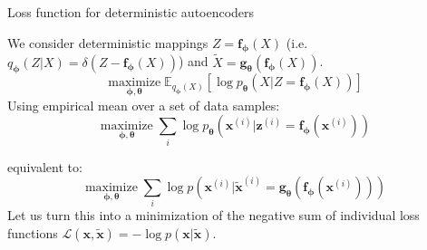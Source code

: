 \documentclass[handout]{beamer}
\begin{document}
  \begin{frame}{Loss function for deterministic autoencoders}

    We consider \alert{deterministic} mappings $Z = \mathbf{f}_{\boldsymbol{\phi}}(X)$ (i.e. $q_{\boldsymbol{\phi}}(Z|X) = \delta(Z - \mathbf{f}_{\boldsymbol{\phi}}(X))$) and $\tilde{X} = \mathbf{g}_{\boldsymbol{\theta}}(\mathbf{f}_{\boldsymbol{\phi}}(X))$.
    \vspace{0cm}
    \begin{equation*}
      \underset{\boldsymbol{\phi},\boldsymbol{\theta}}{\text{maximize}} \; \mathbb{E}_{q_{\boldsymbol{\phi}}(X)}\left[\log p_{\boldsymbol{\theta}}(X|Z = \mathbf{f}_{\boldsymbol{\phi}}(X))\right]
    \end{equation*}
    \pause
    Using empirical mean over a set of data samples:
    \vspace{0cm}
    \begin{equation*}
      \underset{\boldsymbol{\phi},\boldsymbol{\theta}}{\text{maximize}} \; \sum_i \log p_{\boldsymbol{\theta}}(\mathbf{x}^{(i)}|\mathbf{z}^{(i)} = \mathbf{f}_{\boldsymbol{\phi}}(\mathbf{x}^{(i)}))
    \end{equation*}

    equivalent to:
    \vspace{0cm}
    \begin{equation*}
      \underset{\boldsymbol{\phi},\boldsymbol{\theta}}{\text{maximize}} \; \sum_i \log p(\mathbf{x}^{(i)}|\tilde{\mathbf{x}}^{(i)} = \mathbf{g}_{\boldsymbol{\theta}}(\mathbf{f}_{\boldsymbol{\phi}}(\mathbf{x}^{(i)})))
    \end{equation*}
    \pause
    Let us turn this into a minimization of the negative sum of individual loss functions $\mathcal{L}(\mathbf{x}, \tilde{\mathbf{x}}) = -\log p(\mathbf{x}|\tilde{\mathbf{x}})$.
    
  \end{frame}
\end{document}
